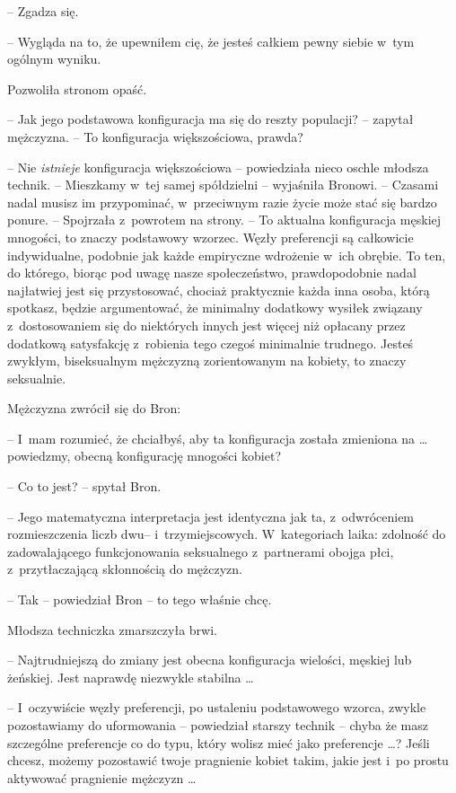\documentclass[oneside,polish,11pt,rmheadings]{mwbk}
\begin{document}
 -- Zgadza się. 

-- Wygląda na to, że upewniłem cię, że jesteś całkiem pewny siebie w~tym ogólnym wyniku. 

Pozwoliła stronom opaść. 

-- Jak jego podstawowa konfiguracja ma się do reszty populacji? --  zapytał mężczyzna. -- To konfiguracja większościowa, prawda? 

-- Nie \textit{istnieje }konfiguracja większościowa -- powiedziała nieco oschle młodsza technik. -- Mieszkamy w~tej samej spółdzielni -- wyjaśniła Bronowi. -- Czasami nadal musisz im przypominać, w~przeciwnym razie życie może stać się bardzo ponure. -- Spojrzała z~powrotem na strony. -- To aktualna konfiguracja męskiej mnogości, to znaczy podstawowy wzorzec. Węzły preferencji są całkowicie indywidualne, podobnie jak każde empiryczne wdrożenie w~ich obrębie. To ten, do którego, biorąc pod uwagę nasze społeczeństwo, prawdopodobnie nadal najłatwiej jest się przystosować, chociaż praktycznie każda inna osoba, którą spotkasz, będzie argumentować, że minimalny dodatkowy wysiłek związany z~dostosowaniem się do niektórych innych jest więcej niż opłacany przez dodatkową satysfakcję z~robienia tego czegoś minimalnie trudnego. Jesteś zwykłym, biseksualnym mężczyzną zorientowanym na kobiety, to znaczy seksualnie. 

Mężczyzna zwrócił się do Bron: 

-- I~mam rozumieć, że chciałbyś, aby ta konfiguracja została zmieniona na \ldots  powiedzmy, obecną konfigurację mnogości kobiet? 

-- Co to jest? -- spytał Bron. 

-- Jego matematyczna interpretacja jest identyczna jak ta, z~odwróceniem rozmieszczenia liczb dwu-- i~trzymiejscowych. W~kategoriach laika: zdolność do zadowalającego funkcjonowania seksualnego z~partnerami obojga płci, z~przytłaczającą skłonnością do mężczyzn. 

-- Tak -- powiedział Bron -- to tego właśnie chcę. 

Młodsza techniczka zmarszczyła brwi. 

-- Najtrudniejszą do zmiany jest obecna konfiguracja wielości, męskiej lub żeńskiej. Jest naprawdę niezwykle stabilna \ldots  

-- I~oczywiście węzły preferencji, po ustaleniu podstawowego wzorca, zwykle pozostawiamy do uformowania --  powiedział starszy technik -- chyba że masz szczególne preferencje co do typu, który wolisz mieć jako preferencje  \ldots  ? Jeśli chcesz, możemy pozostawić twoje pragnienie kobiet takim, jakie jest i~po prostu aktywować pragnienie mężczyzn \ldots  
\end{document}
